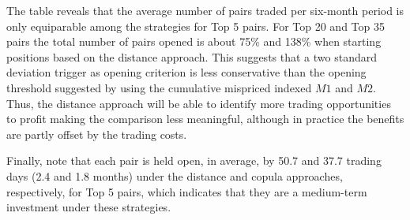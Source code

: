 \documentclass[a4paper,12pt]{report}
\begin{document}
The table reveals that the average number of pairs traded per six-month period is only equiparable among the strategies for Top 5 pairs. For Top 20 and Top 35 pairs the total number of pairs opened is about 75\% and 138\% when starting positions based on the distance approach. This suggests that a two standard deviation trigger as opening criterion is less conservative than the opening threshold suggested by \citet*{rf15} using the cumulative mispriced indexed $M1$ and $M2$. Thus, the distance approach will be able to identify more trading opportunities to profit making the comparison less meaningful, although in practice the benefits are partly offset by the trading costs.


%	
%	
%	
%	

Finally, note that each pair is held open, in average, by 50.7 and 37.7 trading days (2.4 and 1.8 months) under the distance and copula approaches, respectively, for Top 5 pairs, which indicates that they are a medium-term investment under these strategies.
\end{document}
